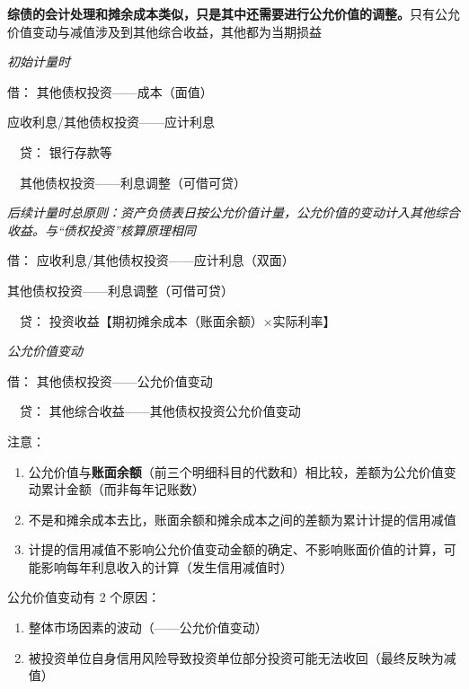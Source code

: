 \documentclass[UTF8,12pt]{ctexart}
\newenvironment{Dr}{\noindent 借：}{\par}
\newenvironment{Cr}{\noindent \ \ 贷：}{\par}
\numberwithin{equation}{section} %
\numberwithin{figure}{section}
\numberwithin{table}{section}
\begin{document}
	\textbf{综债的会计处理和摊余成本类似，只是其中还需要进行公允价值的调整。}只有公允价值变动与减值涉及到其他综合收益，其他都为当期损益
	
	\textit{初始计量时}
	
	\begin{Dr}
		其他债权投资——成本（面值）
		
		应收利息/其他债权投资——应计利息
	\end{Dr}
	\begin{Cr}
		银行存款等
		
		\ \ 其他债权投资——利息调整（可借可贷）
	\end{Cr}

	
	
	\textit{后续计量时总原则：资产负债表日按公允价值计量，公允价值的变动计入其他综合收益。与“债权投资”核算原理相同}
	
	\begin{Dr}
		应收利息/其他债权投资——应计利息（双面）
		
		其他债权投资——利息调整（可借可贷）
	\end{Dr}
	\begin{Cr}
		投资收益【期初摊余成本（账面余额）×实际利率】
	\end{Cr}

	\textit{公允价值变动}
	
	\begin{Dr}
		其他债权投资——公允价值变动
	\end{Dr}
	\begin{Cr}
		其他综合收益——其他债权投资公允价值变动
	\end{Cr}
	
	注意：
	\begin{enumerate}
		\item 公允价值与\textbf{账面余额}（前三个明细科目的代数和）相比较，差额为公允价值变动累计金额（而非每年记账数）
		
		\item 不是和摊余成本去比，账面余额和摊余成本之间的差额为累计计提的信用减值
		
		\item 计提的信用减值不影响公允价值变动金额的确定、不影响账面价值的计算，可能影响每年利息收入的计算（发生信用减值时）
	\end{enumerate}
	
	
	
	公允价值变动有 2 个原因：
	\begin{enumerate}
		\item 整体市场因素的波动（——公允价值变动）
		
		\item 被投资单位自身信用风险导致投资单位部分投资可能无法收回（最终反映为减值）
	\end{enumerate}
	
\end{document}
